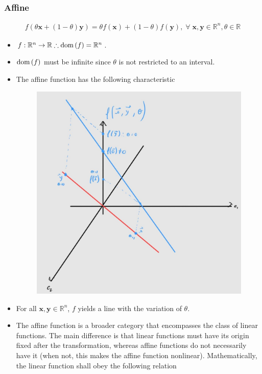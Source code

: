 \documentclass{article}
\newcommand{\dom}[1]{\ensuremath{\textnormal{dom}\left(#1\right)}} %
\begin{document}
\subsubsection{Affine}
\begin{align}
    f(\theta \mathbf{x} + (1-\theta)\mathbf{y}) = \theta f(\mathbf{x}) + (1-\theta)f(\mathbf{y}),\;\forall\; \mathbf{x}, \mathbf{y} \in \mathbb{R}^{n}, \theta\in\mathbb{R}
\end{align}
\begin{itemize}
    \item \(f: \mathbb{R}^{n} \rightarrow \mathbb{R} \therefore \dom{f} = \mathbb{R}^{n}\).
    \item \(\dom{f}\) must be infinite since \(\theta\) is not restricted to an interval.
    \item The affine function has the following characteristic
    \begin{figure}[H]
        \centering
        \includegraphics[scale=.2]{figs/affine.png}
    \end{figure}
    \item For all \(\mathbf{x}, \mathbf{y} \in \mathbb{R}^{n}\), \(f\) yields a line with the variation of \(\theta\).
    \item The affine function is a broader category that encompasses the class of linear functions. The main difference is that linear functions must have its origin fixed after the transformation, whereas affine functions do not necessarily have it (when not, this makes the affine function nonlinear). Mathematically, the linear function shall obey the following relation

\end{itemize}
\end{document}
